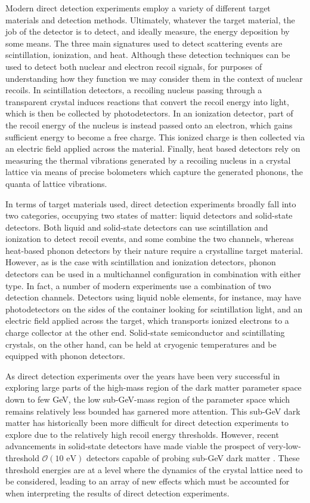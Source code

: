 Modern direct detection experiments employ a variety of different target materials and detection methods. Ultimately, whatever the target material, the job of the detector is to detect, and ideally measure, the energy deposition by some means. The three main signatures used to detect scattering events are scintillation, ionization, and heat. Although these detection techniques can be used to detect both nuclear and electron recoil signals, for purposes of understanding how they function we may consider them in the context of nuclear recoils. In scintillation detectors, a recoiling nucleus passing through a transparent crystal induces reactions that convert the recoil energy into light, which is then be collected by photodetectors. In an ionization detector, part of the recoil energy of the nucleus is instead passed onto an electron, which gains sufficient energy to become a free charge. This ionized charge is then collected via an electric field applied across the material. Finally, heat based detectors rely on measuring the thermal vibrations generated by a recoiling nucleus in a crystal lattice via means of precise bolometers which capture the generated phonons, the quanta of lattice vibrations.

In terms of target materials used, direct detection experiments broadly fall into two categories, occupying two states of matter: liquid detectors and solid-state detectors. Both liquid and solid-state detectors can use scintillation and ionization to detect recoil events, and some combine the two channels, whereas heat-based phonon detectors by their nature require a crystalline target material. However, as is the case with scintillation and ionization detectors, phonon detectors can be used in a multichannel configuration in combination with either type. In fact, a number of modern experiments use a combination of two detection channels. Detectors using liquid noble elements, for instance, may have photodetectors on the sides of the container looking for scintillation light, and an electric field applied across the target, which transports ionized electrons to a charge collector at the other end. Solid-state semiconductor and scintillating crystals, on the other hand, can be held at cryogenic temperatures and be equipped with phonon detectors.

As direct detection experiments over the years have been very successful in exploring large parts of the high-mass region of the dark matter parameter space down to few GeV, the low sub-GeV-mass region of the parameter space which remains relatively less bounded has garnered more attention. This sub-GeV dark matter has historically been more difficult for direct detection experiments to explore due to the relatively high recoil energy thresholds. However, recent advancements in solid-state detectors have made viable the prospect of very-low-threshold $\mathcal{O}(\text{10 eV})$ detectors capable of probing sub-GeV dark matter \parencites{RomaniEtAl2018, CrislerEtAl2018, EDELWEISS2020}. These threshold energies are at a level where the dynamics of the crystal lattice need to be considered, leading to an array of new effects which must be accounted for when interpreting the results of direct detection experiments.

